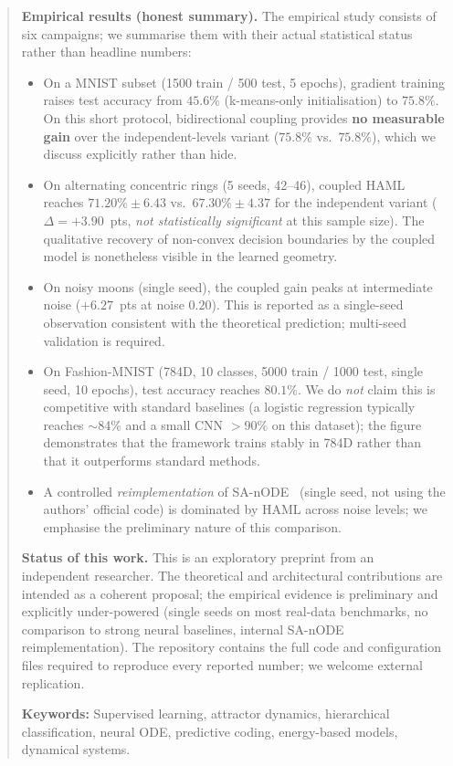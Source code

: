 \documentclass[11pt,a4paper]{article}
\begin{document}
\begin{abstract}
\textbf{Empirical results (honest summary).}
The empirical study consists of six campaigns; we summarise them with their actual
statistical status rather than headline numbers:
\begin{itemize}
  \item On a MNIST subset (1500 train / 500 test, 5 epochs), gradient training raises test
        accuracy from $45.6\%$ (k-means-only initialisation) to $75.8\%$. On this short
        protocol, bidirectional coupling provides \textbf{no measurable gain} over the
        independent-levels variant ($75.8\%$ vs.\ $75.8\%$), which we discuss explicitly
        rather than hide.
  \item On alternating concentric rings (5 seeds, 42--46), coupled HAML reaches
        $71.20\% \pm 6.43$ vs.\ $67.30\% \pm 4.37$ for the independent variant
        ($\Delta = +3.90$~pts, \emph{not statistically significant} at this sample size).
        The qualitative recovery of non-convex decision boundaries by the coupled model is
        nonetheless visible in the learned geometry.
  \item On noisy moons (single seed), the coupled gain peaks at intermediate noise
        ($+6.27$~pts at noise $0.20$). This is reported as a single-seed observation
        consistent with the theoretical prediction; multi-seed validation is required.
  \item On Fashion-MNIST (784D, 10 classes, 5000 train / 1000 test, single seed,
        10 epochs), test accuracy reaches $80.1\%$. We do \emph{not} claim this is
        competitive with standard baselines (a logistic regression typically reaches
        $\sim$84\% and a small CNN $>90\%$ on this dataset); the figure demonstrates that
        the framework trains stably in 784D rather than that it outperforms standard
        methods.
  \item A controlled \emph{reimplementation} of SA-nODE~\cite{marino2024} (single seed,
        not using the authors' official code) is dominated by HAML across noise levels;
        we emphasise the preliminary nature of this comparison.
\end{itemize}

\textbf{Status of this work.} This is an exploratory preprint from an independent
researcher. The theoretical and architectural contributions are intended as a coherent
proposal; the empirical evidence is preliminary and explicitly under-powered (single
seeds on most real-data benchmarks, no comparison to strong neural baselines, internal
SA-nODE reimplementation). The repository contains the full code and configuration files
required to reproduce every reported number; we welcome external replication.

\textbf{Keywords:} Supervised learning, attractor dynamics, hierarchical classification,
neural ODE, predictive coding, energy-based models, dynamical systems.
\end{abstract}
\end{document}
